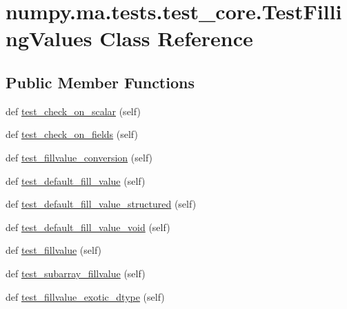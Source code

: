 \hypertarget{classnumpy_1_1ma_1_1tests_1_1test__core_1_1TestFillingValues}{}\section{numpy.\+ma.\+tests.\+test\+\_\+core.\+Test\+Filling\+Values Class Reference}
\label{classnumpy_1_1ma_1_1tests_1_1test__core_1_1TestFillingValues}
\subsection*{Public Member Functions}
\begin{DoxyCompactItemize}
\item 
def \hyperlink{classnumpy_1_1ma_1_1tests_1_1test__core_1_1TestFillingValues_a255ec543e0233c8975c8b89beebfa98b}{test\+\_\+check\+\_\+on\+\_\+scalar} (self)
\item 
def \hyperlink{classnumpy_1_1ma_1_1tests_1_1test__core_1_1TestFillingValues_a08814ee119332d1644174cf9cb132f71}{test\+\_\+check\+\_\+on\+\_\+fields} (self)
\item 
def \hyperlink{classnumpy_1_1ma_1_1tests_1_1test__core_1_1TestFillingValues_ae92e48d4cad0dd1c558cd138847056ab}{test\+\_\+fillvalue\+\_\+conversion} (self)
\item 
def \hyperlink{classnumpy_1_1ma_1_1tests_1_1test__core_1_1TestFillingValues_a61daf121432c17f8187b0b4604626a2c}{test\+\_\+default\+\_\+fill\+\_\+value} (self)
\item 
def \hyperlink{classnumpy_1_1ma_1_1tests_1_1test__core_1_1TestFillingValues_a48882266ec20a7b740d8cf6ea75f05c9}{test\+\_\+default\+\_\+fill\+\_\+value\+\_\+structured} (self)
\item 
def \hyperlink{classnumpy_1_1ma_1_1tests_1_1test__core_1_1TestFillingValues_ab0c0ad74cc2f87a3298f05064cf709d3}{test\+\_\+default\+\_\+fill\+\_\+value\+\_\+void} (self)
\item 
def \hyperlink{classnumpy_1_1ma_1_1tests_1_1test__core_1_1TestFillingValues_afc6e4cd722cb0e98544ff4b61802b41c}{test\+\_\+fillvalue} (self)
\item 
def \hyperlink{classnumpy_1_1ma_1_1tests_1_1test__core_1_1TestFillingValues_a693d319a6b6d0067a8bf91d2c15c7373}{test\+\_\+subarray\+\_\+fillvalue} (self)
\item 
def \hyperlink{classnumpy_1_1ma_1_1tests_1_1test__core_1_1TestFillingValues_a4791d6d516c09a5b43ee25c6004409a8}{test\+\_\+fillvalue\+\_\+exotic\+\_\+dtype} (self)

\end{DoxyCompactItemize}
